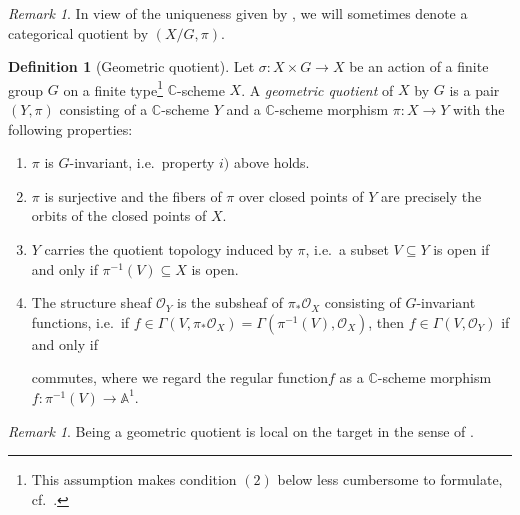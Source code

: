 \documentclass[12pt,a4paper]{amsart}
\theoremstyle{plain}
\theoremstyle{definition}
\newtheorem{defn}[thm]{Definition}
\theoremstyle{remark}
\newtheorem{rem}[thm]{Remark}
\begin{document}
\begin{rem}
  In view of the uniqueness given by , we will sometimes denote a categorical quotient by $(X/G, \pi)$.
\end{rem}

\begin{defn}[Geometric quotient]
  Let $\sigma \colon X \times G \to X$ be an action of a finite group $G$ on a finite type\footnote{This assumption makes condition $(2)$ below less cumbersome to formulate, cf.~\cite[Definition 0.6]{mfk94}.} $\mathbb{C}$-scheme $X$.
  A \textit{geometric quotient} of $X$ by $G$ is a pair $(Y, \pi)$ consisting of a $\mathbb{C}$-scheme $Y$ and a $\mathbb{C}$-scheme morphism $\pi \colon X \to Y$ with the following properties:
  \begin{enumerate}
    \item $\pi$ is $G$-invariant, i.e.~property $i)$ above holds.
    \item $\pi$ is surjective and the fibers of $\pi$ over closed points of $Y$ are precisely the orbits of the closed points of $X$.
    \item $Y$ carries the quotient topology induced by $\pi$, i.e.~a subset $V \subseteq Y$ is open if and only if $\pi^{-1}(V) \subseteq X$ is open.
    \item The structure sheaf $\mathscr{O}_{Y}$ is the subsheaf of $\pi_{*}\mathscr{O}_{X}$ consisting of $G$-invariant functions, i.e.~if $f \in \Gamma(V, \pi_{*}\mathscr{O}_{X}) = \Gamma(\pi^{-1}(V),\mathscr{O}_{X})$, then $f \in \Gamma(V, \mathscr{O}_{Y})$ if and only if

      \begin{center}
      \end{center}
      commutes, where we regard the regular function$f$ as a $\mathbb{C}$-scheme morphism $f \colon \pi^{-1}(V) \to \mathbb{A}^{1}$.
    \end{enumerate}
\end{defn}

\begin{rem}\label{rem:loct}
  Being a geometric quotient is local on the target in the sense of \cite[Appendix C]{gw10}.
\end{rem}
\end{document}
